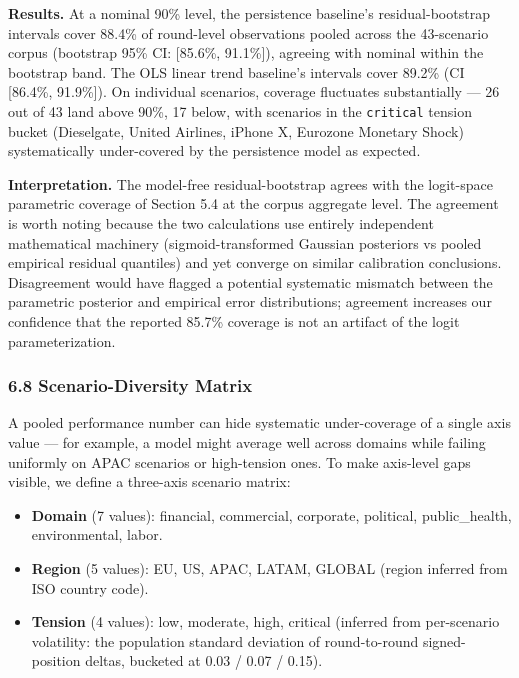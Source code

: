 \documentclass[
]{article}
\providecommand{\tightlist}{%
  \setlength{\itemsep}{0pt}\setlength{\parskip}{0pt}}
\begin{document}
\textbf{Results.} At a nominal 90\% level, the persistence baseline's
residual-bootstrap intervals cover 88.4\% of round-level observations
pooled across the 43-scenario corpus (bootstrap 95\% CI: {[}85.6\%,
91.1\%{]}), agreeing with nominal within the bootstrap band. The OLS
linear trend baseline's intervals cover 89.2\% (CI {[}86.4\%,
91.9\%{]}). On individual scenarios, coverage fluctuates substantially
--- 26 out of 43 land above 90\%, 17 below, with scenarios in the
\texttt{critical} tension bucket (Dieselgate, United Airlines, iPhone X,
Eurozone Monetary Shock) systematically under-covered by the persistence
model as expected.

\textbf{Interpretation.} The model-free residual-bootstrap agrees with
the logit-space parametric coverage of Section 5.4 at the corpus
aggregate level. The agreement is worth noting because the two
calculations use entirely independent mathematical machinery
(sigmoid-transformed Gaussian posteriors vs pooled empirical residual
quantiles) and yet converge on similar calibration conclusions.
Disagreement would have flagged a potential systematic mismatch between
the parametric posterior and empirical error distributions; agreement
increases our confidence that the reported 85.7\% coverage is not an
artifact of the logit parameterization.

\subsubsection{6.8 Scenario-Diversity
Matrix}\label{scenario-diversity-matrix}

A pooled performance number can hide systematic under-coverage of a
single axis value --- for example, a model might average well across
domains while failing uniformly on APAC scenarios or high-tension ones.
To make axis-level gaps visible, we define a three-axis scenario matrix:

\begin{itemize}
\tightlist
\item
  \textbf{Domain} (7 values): financial, commercial, corporate,
  political, public\_health, environmental, labor.
\item
  \textbf{Region} (5 values): EU, US, APAC, LATAM, GLOBAL (region
  inferred from ISO country code).
\item
  \textbf{Tension} (4 values): low, moderate, high, critical (inferred
  from per-scenario volatility: the population standard deviation of
  round-to-round signed-position deltas, bucketed at 0.03 / 0.07 /
  0.15).
\end{itemize}
\end{document}
